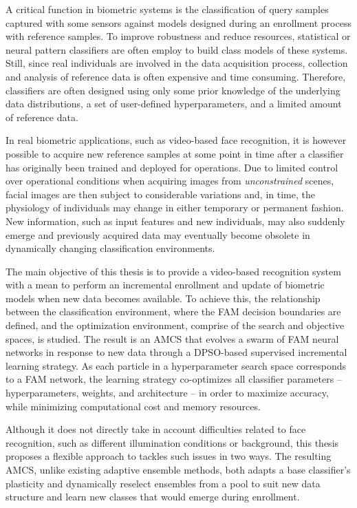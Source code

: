 A critical function in biometric systems is the classification of query samples captured with some sensors against models designed during an enrollment process with reference samples.
To improve robustness and reduce resources, statistical or neural pattern classifiers are often employ to build class models of these systems.
Still, since real individuals are involved in the data acquisition process, collection and analysis of reference data is often expensive and time consuming.
Therefore, classifiers are often designed using only some prior knowledge of the underlying data distributions, a set of user-defined hyperparameters, and a limited amount of reference data.

In real biometric applications, such as video-based face recognition, it is however possible to acquire new reference samples at some point in time after a classifier has originally been trained and deployed for operations.
Due to limited control over operational conditions when acquiring images from \emph{unconstrained} scenes, facial images are then subject to considerable variations and, in time, the physiology of individuals may change in either temporary or permanent fashion.
New information, such as input features and new individuals, may also suddenly emerge and previously acquired data may eventually become obsolete in dynamically changing classification environments.

The main objective of this thesis is to provide a video-based recognition system with a mean to perform an incremental enrollment and update of biometric models when new data becomes available.
To achieve this, the relationship between the classification environment, where the FAM decision boundaries are defined, and the optimization environment, comprise of the search and objective spaces, is studied.
The result is an AMCS that evolves a swarm of FAM neural networks in response to new data through a DPSO-based supervised incremental learning strategy.
As each particle in a hyperparameter search space corresponds to a FAM network, the learning strategy co-optimizes all classifier parameters -- hyperparameters, weights, and architecture -- in order to maximize accuracy, while minimizing computational cost and memory resources.

Although it does not directly take in account difficulties related to face recognition, such as different illumination conditions or background, this thesis proposes a flexible approach to tackles such issues in two ways.
The resulting AMCS, unlike existing adaptive ensemble methods, both adapts a base classifier's plasticity and dynamically reselect ensembles from a pool to suit new data structure and learn new classes that would emerge during enrollment.

